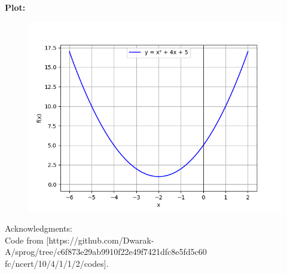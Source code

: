 \documentclass[journal]{IEEEtran}
\begin{document}
\newpage
\textbf{Plot:}
\begin{figure}[h]
   \centering
   \includegraphics[width=\columnwidth]{figs/figure.png}
\end{figure}


Acknowledgments:\\  
Code from [https://github.com/Dwarak-A/sprog/tree/c6f873e29ab9910f22e49f7421dfc8e5fd5c60
fc/ncert/10/4/1/1/2/codes].
\end{document}

